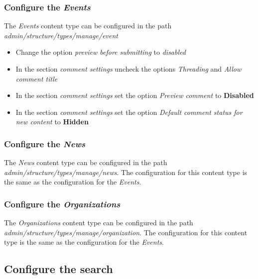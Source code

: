 \subsubsection{Configure the \textit{Events}}
The \textit{Events} content type can be configured in the path \textit{admin/structure/types/manage/event}
\begin{itemize}
	\item Change the option \textit{preview before submitting} to \textit{disabled}
	\item In the section \textit{comment settings} uncheck the options \textit{Threading} and \textit{Allow comment title}
	\item In the section \textit{comment settings} set the option \textit{Preview comment} to \textbf{Disabled}
	\item In the section \textit{comment settings} set the option \textit{Default comment status for new content} to \textbf{Hidden}
\end{itemize}

\subsubsection{Configure the \textit{News}}
The \textit{News} content type can be configured in the path \textit{admin/structure/types/manage/news}.  The configuration for this content type is the same as the configuration for the \textit{Events}.

\subsubsection{Configure the \textit{Organizations}}
The \textit{Organizations} content type can be configured in the path \textit{admin/structure/types/manage/organization}.  The configuration for this content type is the same as the configuration for the \textit{Events}.



\subsection{Configure the search}
